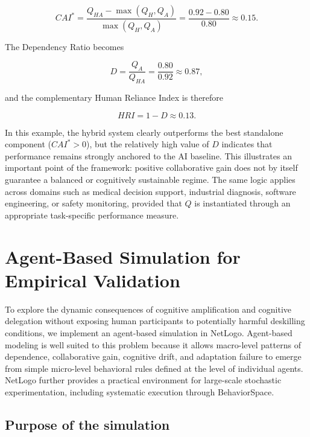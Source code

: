 \documentclass[11pt,a4paper]{article}
\begin{document}
\begin{equation}
CAI^* = \frac{Q_{HA} - \max(Q_H, Q_A)}{\max(Q_H, Q_A)}
      = \frac{0.92 - 0.80}{0.80}
      \approx 0.15.
\end{equation}

The Dependency Ratio becomes

\begin{equation}
D = \frac{Q_A}{Q_{HA}} = \frac{0.80}{0.92} \approx 0.87,
\end{equation}

and the complementary Human Reliance Index is therefore

\begin{equation}
HRI = 1 - D \approx 0.13.
\end{equation}

In this example, the hybrid system clearly outperforms the best standalone component ($CAI^* > 0$), but the relatively high value of $D$ indicates that performance remains strongly anchored to the AI baseline. This illustrates an important point of the framework: positive collaborative gain does not by itself guarantee a balanced or cognitively sustainable regime. The same logic applies across domains such as medical decision support, industrial diagnosis, software engineering, or safety monitoring, provided that $Q$ is instantiated through an appropriate task-specific performance measure.

\section{Agent-Based Simulation for Empirical Validation}

To explore the dynamic consequences of cognitive amplification and cognitive delegation without exposing human participants to potentially harmful deskilling conditions, we implement an agent-based simulation in NetLogo. Agent-based modeling is well suited to this problem because it allows macro-level patterns of dependence, collaborative gain, cognitive drift, and adaptation failure to emerge from simple micro-level behavioral rules defined at the level of individual agents. NetLogo further provides a practical environment for large-scale stochastic experimentation, including systematic execution through BehaviorSpace.

\subsection{Purpose of the simulation}
\end{document}
